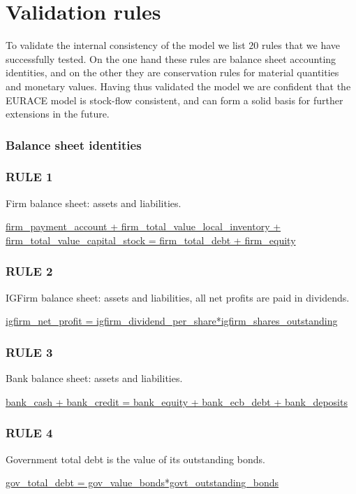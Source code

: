 \section{Validation rules}

To validate the internal consistency of the model we list $20$ rules that we have successfully tested.
On the one hand these rules are balance sheet accounting identities, and on the other they are 
conservation rules for material quantities and monetary values. Having thus validated the model
we are confident that the EURACE model is stock-flow consistent, and can form a solid basis for further extensions in the future.

\subsubsection*{Balance sheet identities}

\subsubsection*{RULE 1}
Firm balance sheet: assets and liabilities.

\bigskip
\url{firm_payment_account + firm_total_value_local_inventory + firm_total_value_capital_stock = firm_total_debt + firm_equity}

\subsubsection*{RULE 2}
IGFirm balance sheet: assets and liabilities, all net profits are paid in dividends.

\bigskip
\url{igfirm_net_profit = igfirm_dividend_per_share*igfirm_shares_outstanding}

\subsubsection*{RULE 3}
Bank balance sheet: assets and liabilities.

\bigskip
\url{bank_cash + bank_credit = bank_equity + bank_ecb_debt + bank_deposits}

\subsubsection*{RULE 4}
Government total debt is the value of its outstanding bonds.

\bigskip
\url{gov_total_debt = gov_value_bonds*govt_outstanding_bonds}

